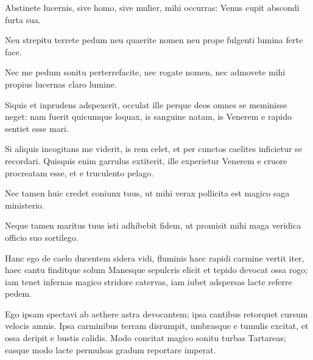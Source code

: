 \noindent Abstinete lucernis, sive homo, sive mulier, mihi occurras: Venus cupit abscondi furta sua. \\

{\large

\noindent Neu strepitu terrete pedum neu quaerite nomen neu prope fulgenti lumina ferte face.\\

}


\noindent Nec me pedum sonitu perterrefacite, nec rogate nomen, nec admovete mihi propius lucernas claro lumine. \\

{\large

\noindent Siquis et inprudens adspexerit, occulat ille perque deos omnes se meminisse neget: nam fuerit quicumque loquax, is sanguine natam, is Venerem e rapido sentiet esse mari.\\

}


\noindent Si aliquis incogitans me viderit, is rem celet, et per cunctos caelites inficietur se recordari. Quisquis enim garrulus extiterit, ille experietur Venerem e cruore procreatam esse, et e truculento pelago. \\

{\large

\noindent Nec tamen huic credet coniunx tuus, ut mihi verax pollicita est magico saga ministerio.\\

}


\noindent Neque tamen maritus tuus isti adhibebit fidem, ut promisit mihi maga veridica officio suo sortilego. \\

\newpage

{\large

\noindent Hanc ego de caelo ducentem sidera vidi, fluminis haec rapidi carmine vertit iter, haec cantu finditque solum Manesque sepulcris elicit et tepido devocat ossa rogo; iam tenet infernas magico stridore catervas, iam iubet adspersas lacte referre pedem.\\

}


\noindent Ego ipsam spectavi ab aethere astra devocantem; ipsa cantibus retorquet cursum velocis amnis. Ipsa carminibus terram disrumpit, umbrasque e tumulis excitat, et ossa deripit e bustis calidis. Modo concitat magico sonitu turbas Tartareas; easque modo lacte permulsas gradum reportare imperat. \\

